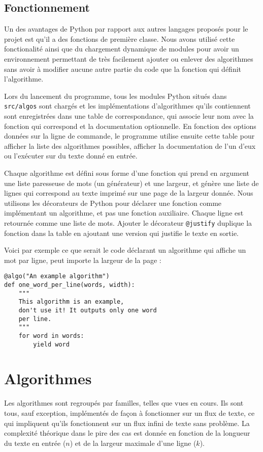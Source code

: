 \documentclass{article}
\begin{document}
\section{Fonctionnement}

Un des avantages de Python par rapport aux autres langages proposés pour le
projet est qu'il a des fonctions de première classe. Nous avons utilisé cette
fonctionalité ainsi que du chargement dynamique de modules pour avoir un
environnement permettant de très facilement ajouter ou enlever des algorithmes
sans avoir à modifier aucune autre partie du code que la fonction qui définit
l'algorithme.

Lors du lancement du programme, tous les modules Python situés dans
\verb|src/algos| sont chargés et les implémentations d'algorithmes qu'ils
contiennent sont enregistrées dans une table de correspondance, qui associe leur
nom avec la fonction qui correspond et la documentation optionnelle. En fonction
des options données sur la ligne de commande, le programme utilise ensuite cette
table pour afficher la liste des algorithmes possibles, afficher la
documentation de l'un d'eux ou l'exécuter sur du texte donné en entrée.

Chaque algorithme est défini sous forme d'une fonction qui prend en argument une
liste paresseuse de mots (un générateur) et une largeur, et génère une liste
de lignes qui correspond au texte imprimé sur une page de la largeur donnée.
Nous utilisons les décorateurs de Python pour déclarer une fonction comme
implémentant un algorithme, et pas une fonction auxiliaire. Chaque ligne est
retournée comme une liste de mots. Ajouter le décorateur \verb|@justify|
duplique la fonction dans la table en ajoutant une version qui justifie le texte
en sortie.

Voici par exemple ce que serait le code déclarant un algorithme qui affiche un
mot par ligne, peut importe la largeur de la page :

\begin{verbatim}
@algo("An example algorithm")
def one_word_per_line(words, width):
    """
    This algorithm is an example,
    don't use it! It outputs only one word
    per line.
    """
    for word in words:
        yield word
\end{verbatim}

\chapter{Algorithmes}

Les algorithmes sont regroupés par familles, telles que vues en cours. Ils sont
tous, sauf exception, implémentés de façon à fonctionner sur un flux de texte,
ce qui impliquent qu'ils fonctionnent sur un flux infini de texte sans problème.
La complexité théorique dans le pire des cas est donnée en fonction de la
longueur du texte en entrée ($n$) et de la largeur maximale d'une ligne ($k$).
\end{document}
